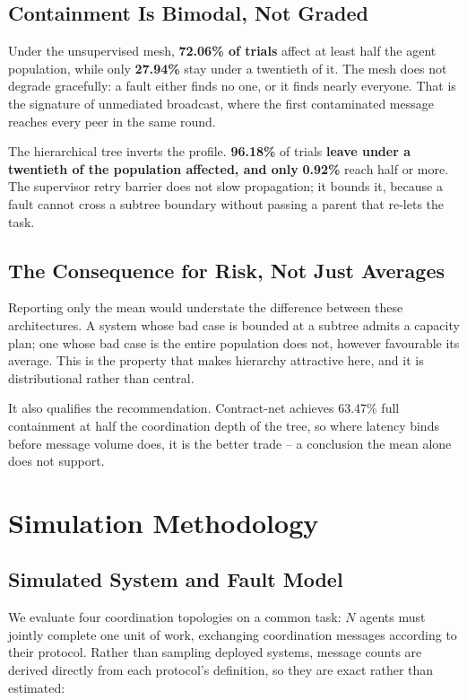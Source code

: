 \documentclass{article}
\begin{document}
\subsection{Containment Is Bimodal, Not Graded}


Under the unsupervised mesh, \textbf{72.06\% of trials}
affect at least half the agent population, while only
\textbf{27.94\%} stay under a twentieth of it. The mesh
does not degrade gracefully: a fault either finds no one, or it finds nearly
everyone. That is the signature of unmediated broadcast, where the first
contaminated message reaches every peer in the same round.

The hierarchical tree inverts the profile. \textbf{96.18\%}
of trials\textbf{ leave under a twentieth of the population affected, and only}
\textbf{0.92\%} reach half or more. The supervisor
retry barrier does not slow propagation; it bounds it, because a fault cannot cross
a subtree boundary without passing a parent that re-lets the task.


\subsection{The Consequence for Risk, Not Just Averages}


Reporting only the mean would understate the difference between these
architectures. A system whose bad case is bounded at a subtree admits a capacity
plan; one whose bad case is the entire population does not, however favourable its
average. This is the property that makes hierarchy attractive here, and it is
distributional rather than central.

It also qualifies the recommendation. Contract-net achieves
63.47\% full containment at half the
coordination depth of the tree, so where latency binds before message volume does,
it is the better trade -- a conclusion the mean alone does not support.




\section{Simulation Methodology}



\subsection{Simulated System and Fault Model}


We evaluate four coordination topologies on a common task: $N$ agents must jointly complete one unit of work, exchanging coordination messages according to their protocol. Rather than sampling deployed systems, message counts are derived directly from each protocol's definition, so they are exact rather than estimated:
\end{document}

